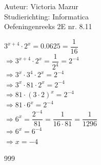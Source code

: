 \documentclass[a4paper]{article}
\begin{document}
  
\noindent \large Auteur: Victoria Mazur \\
\noindent \large Studierichting: Informatica\\
\noindent \large Oefeningenreeks 2E nr. 8.11\\

\medskip

\normalsize

$3^{x+4} \cdot 2^x = 0.0625 = \dfrac{1}{16}$ \\

$\Rightarrow 3^{x+4} \cdot 2^x = \dfrac{1}{2^4} = 2^{-4}$ \\

$\Rightarrow 3^x \cdot 3^4 \cdot 2^x = 2^{-4}$ \\

$\Rightarrow 3^x \cdot 81 \cdot 2^x = 2^{-4}$ \\

$\Rightarrow 81 \cdot (3 \cdot 2)^x = 2^{-4}$ \\

$\Rightarrow 81 \cdot 6^x = 2^{-4}$ \\

$\Rightarrow 6^x = \dfrac{2^{-4}}{81} = \dfrac{1}{16 \cdot 81} = \dfrac{1}{1296}$ \\

$\Rightarrow 6^x = 6^{-4}$ \\

$\Rightarrow x = -4$ \\

\begin{thebibliography}{999}
\end{thebibliography}
\end{document}
